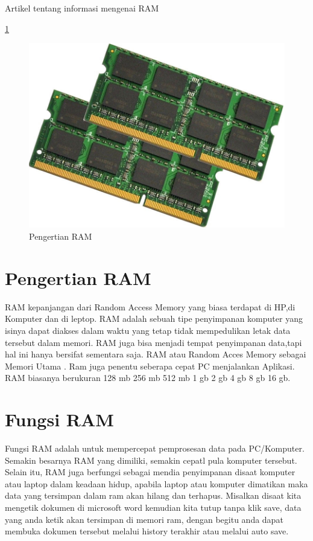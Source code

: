 ﻿%





Artikel tentang informasi mengenai RAM

  \ref{RAM}
  \begin{figure}[ht]
  \centerline{\includegraphics[width=1\textwidth]{figures/RAM.jpg}}
  \caption{Pengertian RAM}
  \label{RAM}
  \end{figure}

\section{Pengertian RAM}
RAM kepanjangan dari Random Access Memory yang biasa terdapat di HP,di Komputer dan di leptop.
RAM adalah sebuah tipe penyimpanan komputer yang isinya dapat diakses dalam waktu yang tetap tidak mempedulikan letak data tersebut dalam memori.
RAM juga bisa menjadi tempat penyimpanan data,tapi hal ini hanya bersifat sementara saja.
RAM atau Random Acces Memory sebagai Memori Utama . Ram juga penentu seberapa cepat PC menjalankan Aplikasi.
RAM biasanya berukuran 128 mb 256 mb 512 mb 1 gb 2 gb 4 gb 8 gb 16 gb.

\section{Fungsi RAM}
Fungsi RAM adalah untuk mempercepat pemprosesan data pada PC/Komputer. Semakin besarnya RAM yang dimiliki, semakin cepatl pula komputer tersebut.
Selain itu, RAM juga berfungsi sebagai mendia penyimpanan disaat komputer atau laptop dalam keadaan hidup, apabila laptop atau komputer dimatikan maka data yang tersimpan dalam ram akan hilang dan terhapus. Misalkan disaat kita mengetik dokumen di microsoft word kemudian kita tutup tanpa klik save, data yang anda ketik akan tersimpan di memori ram, dengan begitu anda dapat membuka dokumen tersebut melalui history terakhir atau melalui auto save.

